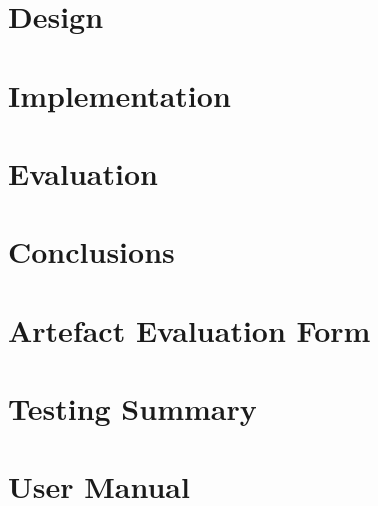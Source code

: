 \documentclass[12pt]{report}
\begin{document}
\chapter{Design}


\chapter{Implementation}


\chapter{Evaluation}


\chapter{Conclusions}


\appendix
\chapter{Artefact Evaluation Form}
\label{appendix:artefact}


\chapter{Testing Summary}

\chapter{User Manual}

\printbibliography[heading=bibintoc, title={References}]
\end{document}
